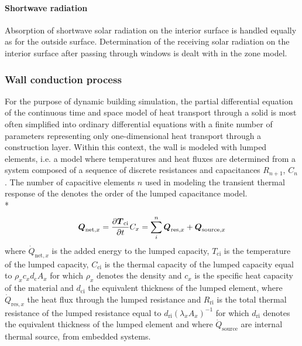 \paragraph{Shortwave radiation}
Absorption of shortwave solar radiation on the interior surface is handled equally as for the outside surface. Determination of the receiving solar radiation on the interior surface after passing through windows is dealt with in the zone model.

\subsubsection{Wall conduction process}


For the purpose of dynamic building simulation, the partial differential equation of the continuous time and space model of heat transport through a solid is most often simplified into ordinary differential equations with a finite number of parameters representing only one-dimensional heat transport through a construction layer. Within this context, the wall is modeled with lumped elements, i.e. a model where temperatures and heat fluxes are determined from a system composed of a sequence of discrete resistances and capacitances $R_{n+1}$, $C_{n}$. The number of capacitive elements $n$ used in modeling the transient thermal response of the  denotes the order of the lumped capacitance model. \\*
\begin{equation}
\boldsymbol{Q}_{\textrm{net},x} = \frac{\partial \boldsymbol{T}_{\textrm{ci}}}{\partial t}C_{x} = \sum_{i}^{n} \boldsymbol{Q}_{\textrm{res},x} + \boldsymbol{Q}_{\textrm{source},x}
\end{equation}
where $\dot{Q}_{\textrm{net},x}$ is the added energy to the lumped capacity, $T_{\textrm{ci}}$ is the temperature of the lumped capacity, $C_{\textrm{ci}}$ is the thermal capacity of the lumped capacity equal to $\rho_{x}c_{x}d_{\textrm{c}}A_{x}$ for which $\rho_{x}$ denotes the density and $c_{x}$ is the specific heat capacity of the material and $d_{\textrm{ci}}$ the equivalent thickness of the lumped element, where $\dot{Q}_{\textrm{res},x}$ the heat flux through the lumped resistance and $R_{\textrm{ri}}$ is the total thermal resistance of the lumped resistance equal to $d_{\textrm{ri}}\left(\lambda_{x}A_{x}\right)^{-1}$ for which $d_{\textrm{ri}}$ denotes the equivalent thickness of the lumped element and where $\dot{Q}_{\textrm{source}}$ are internal thermal source, \eg from embedded systems.

